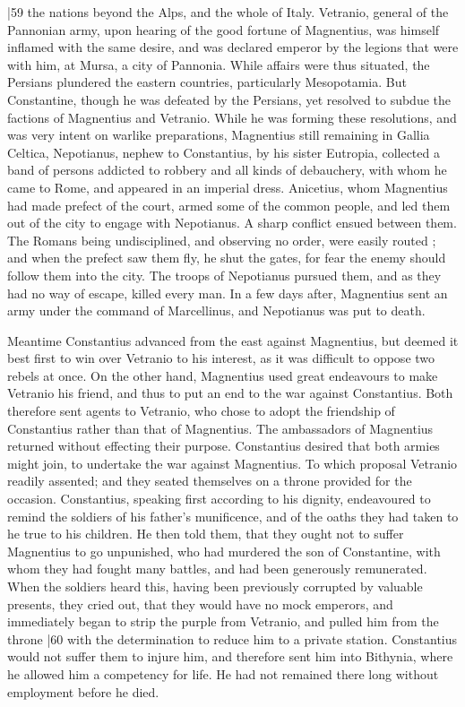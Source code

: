 |59 the nations beyond the Alps, and the whole of Italy. Vetranio, general of the Pannonian army, upon hearing of the good fortune of Magnentius, was himself inflamed with the same desire, and was declared emperor by the legions that were with him, at Mursa, a city of Pannonia. While affairs were thus situated, the Persians plundered the eastern countries, particularly Mesopotamia. But Constantine, though he was defeated by the Persians, yet resolved to subdue the factions of Magnentius and Vetranio. While he was forming these resolutions, and was very intent on warlike preparations, Magnentius still remaining in Gallia Celtica, Nepotianus, nephew to Constantius, by his sister Eutropia, collected a band of persons addicted to robbery and all kinds of debauchery, with whom he came to Rome, and appeared in an imperial dress. Anicetius, whom Magnentius had made prefect of the court, armed some of the common people, and led them out of the city to engage with Nepotianus. A sharp conflict ensued between them. The Romans being undisciplined, and observing no order, were easily routed ; and when the prefect saw them fly, he shut the gates, for fear the enemy should follow them into the city. The troops of Nepotianus pursued them, and as they had no way of escape, killed every man. In a few days after, Magnentius sent an army under the command of Marcellinus, and Nepotianus was put to death.

Meantime Constantius advanced from the east against Magnentius, but deemed it best first to win over Vetranio to his interest, as it was difficult to oppose two rebels at once. On the other hand, Magnentius used great endeavours to make Vetranio his friend, and thus to put an end to the war against Constantius. Both therefore sent agents to Vetranio, who chose to adopt the friendship of Constantius rather than that of Magnentius. The ambassadors of Magnentius returned without effecting their purpose. Constantius desired that both armies might join, to undertake the war against Magnentius. To which proposal Vetranio readily assented; and they seated themselves on a throne provided for the occasion. Constantius, speaking first according to his dignity, endeavoured to remind the soldiers of his father's munificence, and of the oaths they had taken to he true to his children. He then told them, that they ought not to suffer Magnentius to go unpunished, who had murdered the son of Constantine, with whom they had fought many battles, and had been generously remunerated. When
the soldiers heard this, having been previously corrupted by valuable presents, they cried out, that they would have no mock emperors, and immediately began to strip the purple from Vetranio, and pulled him from the throne
|60 with the determination to reduce him to a private station. Constantius would not suffer them to injure him, and therefore sent him into Bithynia, where he allowed him a competency for life. He had not remained there long without employment before he died.

